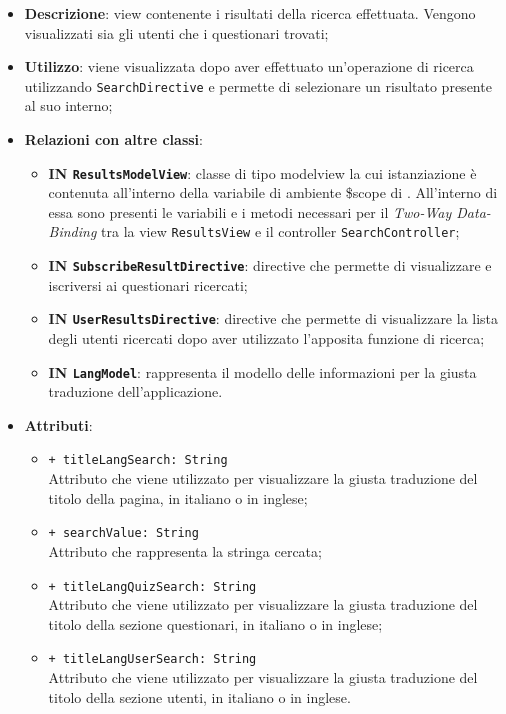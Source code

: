 \begin{itemize}
	\item \textbf{Descrizione}: view contenente i risultati della ricerca effettuata. Vengono visualizzati sia gli utenti che i questionari trovati;
	\item \textbf{Utilizzo}: viene visualizzata dopo aver effettuato un'operazione di ricerca utilizzando \texttt{SearchDirective} e permette di selezionare un risultato presente al suo interno; 
	\item \textbf{Relazioni con altre classi}:
	\begin{itemize}
		\item \textbf{IN \texttt{ResultsModelView}}: classe di tipo modelview la cui istanziazione è contenuta all'interno della variabile di ambiente \$scope di . All'interno di essa sono presenti le variabili e i metodi necessari per il \textit{Two-Way Data-Binding} tra la view \texttt{ResultsView} e il controller \texttt{SearchController};
		\item \textbf{IN \texttt{SubscribeResultDirective}}: directive che permette di visualizzare e iscriversi ai questionari ricercati;
		\item \textbf{IN \texttt{UserResultsDirective}}: directive che permette di visualizzare la lista degli utenti ricercati dopo aver utilizzato l'apposita funzione di ricerca;
		\item \textbf{IN \texttt{LangModel}}: rappresenta il modello delle informazioni per la giusta traduzione dell'applicazione.
	\end{itemize}
	\item \textbf{Attributi}:
		\begin{itemize}
			\item \texttt{+ titleLangSearch: String} \\ Attributo che viene utilizzato per visualizzare la giusta traduzione del titolo della pagina, in italiano o in inglese;
			\item \texttt{+ searchValue: String} \\ Attributo che rappresenta la stringa cercata;
			\item \texttt{+ titleLangQuizSearch: String} \\ Attributo che viene utilizzato per visualizzare la giusta traduzione del titolo della sezione questionari, in italiano o in inglese;
			\item \texttt{+ titleLangUserSearch: String} \\ Attributo che viene utilizzato per visualizzare la giusta traduzione del titolo della sezione utenti, in italiano o in inglese.
		\end{itemize}
\end{itemize}